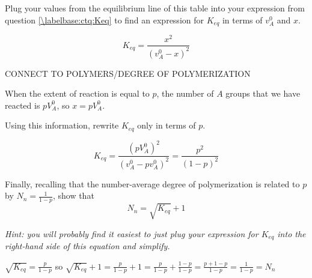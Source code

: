 \begin{activity}
\begin{ctqs}
	\question Plug your values from the equilibrium line of this table into your expression from question \ref{\labelbase:ctq:Keq} to find an expression for $K_{eq}$ in terms of $v_A^0$ and $x$.
	
	
		\begin{solution}[1.5in]
			\begin{equation*}
				K_{eq} = \frac{x^2}{(v_A^0-x)^2}
			\end{equation*}
		\end{solution}
		
\end{ctqs}

\begin{infobox}

	CONNECT TO POLYMERS/DEGREE OF POLYMERIZATION
	
	When the extent of reaction is equal to $p$, the number of $A$ groups that we have reacted is $pV_A^0$, so $x=pV_A^0$. 

\end{infobox}

\begin{ctqs}
	
	\question  Using this information, rewrite $K_{eq}$ only in terms of $p$.
		
		\begin{solution}[1.5in]
			\begin{equation*}
				K_{eq} = \frac{(pV_A^0)^2}{(v_A^0 - pv_A^0)^2} = \frac{p^2}{(1-p)^2}
			\end{equation*}
		\end{solution}
	
	
	\question Finally, recalling that the number-average degree of polymerization is related to $p$ by $N_n = \frac{1}{1-p}$, show that 
		\begin{equation*}
			N_n = \sqrt{K_{eq}} + 1
		\end{equation*}
		
		\emph{Hint: you will probably find it easiest to just plug your expression for $K_{eq}$ into the right-hand side of this equation and simplify.}
		
		\begin{solution}[1.5in]
			$\sqrt{K_{eq}} = \frac{p}{1-p}$ so $\sqrt{K_{eq}}+1 = \frac{p}{1-p} + 1 = \frac{p}{1-p} + \frac{1-p}{1-p} = \frac{p + 1 -p}{1-p} = \frac{1}{1-p} = N_n$
		\end{solution}
		

\end{ctqs}
\end{activity}
